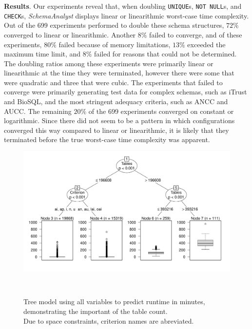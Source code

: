 
\textbf{Results}. Our experiments reveal that, when doubling \texttt{UNIQUE}s, {\tt NOT NULL}s, and {\tt CHECK}s,
\textit{SchemaAnalyst} displays linear or linearithmic worst-case time complexity.  Out of the 699 experiments performed
to double these schema structures, $72\%$ converged to linear or linearithmic.  Another $8\%$ failed to converge, and of
these experiments, $80\%$ failed because of memory limitations, $13\%$ exceeded the maximum time limit, and $8\%$ failed
for reasons that could not be determined.  The doubling ratios among these experiments were primarily linear or
linearithmic at the time they were terminated, however there were some that were quadratic and three that were cubic.
The experiments that failed to converge were primarily generating test data for complex schemas, such as iTrust and
BioSQL, and the most stringent adequacy criteria, such as ANCC and AUCC. The remaining $20\%$ of the 699 experiments
converged on constant or logarithmic.  Since there did not seem to be a pattern in which configurations converged this
way compared to linear or linearithmic, it is likely that they terminated before the true worst-case time complexity was
apparent.

\begin{figure}[t]
\centering
  \centering
  \includegraphics[width=1.025\linewidth]{diagrams/Tree.pdf}
  \vspace*{-.25in}
  \caption{Tree model using all variables to predict runtime in minutes,
  demonstrating the important of the table count. \\ Due to space
  constraints, criterion names are abreviated.
  \vspace{-.315in}}~\label{fig:atree}
\end{figure}

